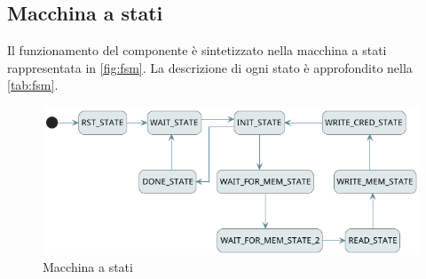 \documentclass[11pt,a4paper]{article}
\begin{document}
\subsection{Macchina a stati}
Il funzionamento del componente è sintetizzato nella macchina a stati rappresentata in \autoref{fig:fsm}. La descrizione di ogni stato è approfondito nella \autoref{tab:fsm}.
\begin{figure}[H]
    \centering
    \includegraphics[scale=.65]{resources/fsm.png}
    \caption{Macchina a stati}
    \label{fig:fsm}
\end{figure}
\end{document}
